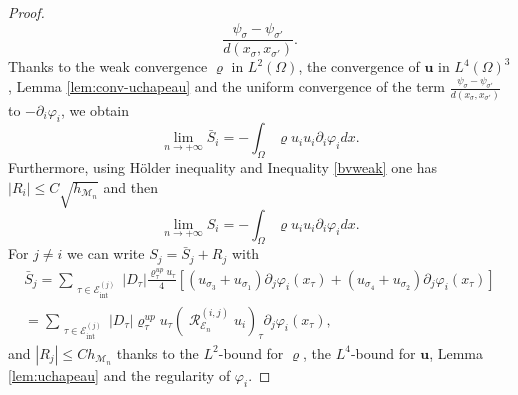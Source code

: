 \documentclass{amsart}
\numberwithin{equation}{section}
\begin{document}
\begin{proof}
\[    \frac {\psi_{{\sigma}} - \psi_{{{\sigma}}'}}{d(x_{{\sigma}}, x_{{{\sigma}}'})}.
\]
Thanks to the weak convergence ${\varrho}$ in $L^2(\Omega)$, the convergence of ${{\boldsymbol u}}$ in $L^4(\Omega)^3$, Lemma \ref{lem:conv-uchapeau} and the uniform
convergence of the term $ \frac {\psi_{{\sigma}} - \psi_{{{\sigma}}'}}{d(x_{{\sigma}}, x_{{{\sigma}}'})}$ to $-\partial_i {\varphi}_i$, we obtain
\[
\lim_{{n {\rightarrow} + \infty}} \bar S_i = -\int_\Omega {\varrho} u_i u_i \partial_i {\varphi}_i dx.
\]
Furthermore, using H\"older inequality and Inequality \eqref{bvweak} one has $| R_i| \le C \sqrt{h_{{{\mathcal M}}_n}}$ and then 
\[
\lim_{{n {\rightarrow} + \infty}} S_i = -\int_\Omega {\varrho} u_i u_i \partial_i {\varphi}_i dx.
\]
For $j \ne i$ we can write $S_j=\bar S_j + R_j$ with
\begin{multline*}
\bar S_j=\sum_{\substack{{\tau} \in {{\mathcal E}_{\mathrm{int}}^{(j)}}}} |D_{\tau} | \frac{ {\varrho}^{up}_{\tau} u_{\tau}}{4} \left[  \left(   {u_{{{\sigma}}_3}+u_{{{\sigma}}_1}}\right) \partial_j {\varphi}_i(x_{\tau}) +  \left(   {u_{{{\sigma}}_4}+u_{{{\sigma}}_2}}\right) \partial_j {\varphi}_i(x_{\tau})  \right]
\\=
\sum_{\substack{{\tau} \in {{\mathcal E}_{\mathrm{int}}^{(j)}}}} |D_{\tau} |  {\varrho}^{up}_{\tau} u_{\tau}  (\operatorname{{\mathcal{R}}}_{\operatorname{{\mathcal{E}}}_n}^{(i,j)} {u_i})_{\tau} \partial_j {\varphi}_i(x_{\tau}),
\end{multline*}
and $|R_j| \le C h_{{{\mathcal M}}_n}$ thanks to the $L^2$-bound for ${\varrho}$, the $L^4$-bound for ${{\boldsymbol u}}$, Lemma \ref{lem:uchapeau} and the
regularity of ${\varphi}_i$.


\end{proof}
\end{document}
